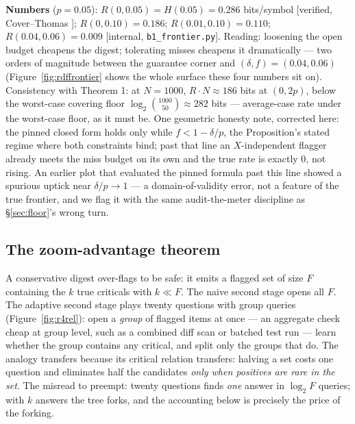 \documentclass[11pt,a4paper]{article}
\begin{document}
\textbf{Numbers} ($p=0.05$): $R(0,0.05)=H(0.05)=0.286$ bits/symbol [verified, Cover--Thomas \cite{coverthomas}]; $R(0,0.10)=0.186$; $R(0.01,0.10)=0.110$; $R(0.04,0.06)=0.009$ [internal, \texttt{b1\_frontier.py}]. Reading: loosening the open budget cheapens the digest; tolerating misses cheapens it dramatically --- two orders of magnitude between the guarantee corner and $(\delta,f)=(0.04,0.06)$ (Figure~\ref{fig:rdffrontier} shows the whole surface these four numbers sit on). Consistency with Theorem 1: at $N{=}1000$, $R\cdot N\approx 186$ bits at $(0,2p)$, below the worst-case covering floor $\log_2\binom{1000}{50}\approx 282$ bits --- average-case rate under the worst-case floor, as it must be. One geometric honesty note, corrected here: the pinned closed form holds only while $f<1-\delta/p$, the Proposition's stated regime where both constraints bind; past that line an $X$-independent flagger already meets the miss budget on its own and the true rate is exactly $0$, not rising. An earlier plot that evaluated the pinned formula past this line showed a spurious uptick near $\delta/p\to1$ --- a domain-of-validity error, not a feature of the true frontier, and we flag it with the same audit-the-meter discipline as \S\ref{sec:floor}'s wrong turn.



\subsection{The zoom-advantage theorem}\label{sec:zoom}
A conservative digest over-flags to be safe: it emits a flagged set of size $F$ containing the $k$ true criticals with $k\ll F$. The naive second stage opens all $F$. The adaptive second stage plays twenty questions with group queries (Figure~\ref{fig:r4rel}): open a \emph{group} of flagged items at once --- an aggregate check cheap at group level, such as a combined diff scan or batched test run --- learn whether the group contains any critical, and split only the groups that do. The analogy transfers because its critical relation transfers: halving a set costs one question and eliminates half the candidates \emph{only when positives are rare in the set}. The misread to preempt: twenty questions finds \emph{one} answer in $\log_2 F$ queries; with $k$ answers the tree forks, and the accounting below is precisely the price of the forking.
\end{document}
